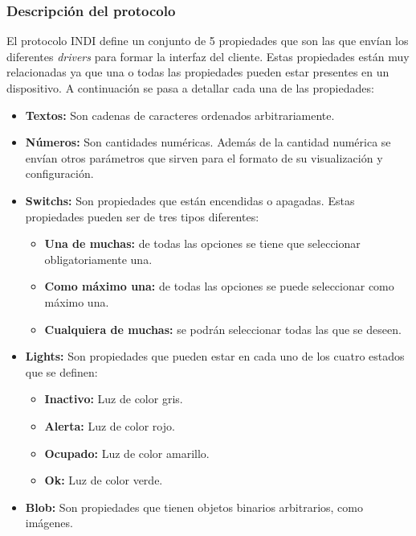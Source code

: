 \subsubsection{Descripción del protocolo}
El protocolo INDI define un conjunto de 5 propiedades que son las que envían los diferentes \textit{drivers} para formar la interfaz del cliente. Estas propiedades están muy relacionadas ya que una o todas las propiedades pueden estar presentes en un dispositivo. A continuación se pasa a detallar cada una de las propiedades:
\begin{itemize}
  \item \textbf{Textos:} Son cadenas de caracteres ordenados arbitrariamente.
  \item \textbf{Números:} Son cantidades numéricas. Además de la cantidad numérica se envían otros parámetros que sirven para el formato de su visualización y configuración.
  \item \textbf{Switchs:} Son propiedades que están encendidas o apagadas. Estas propiedades pueden ser de tres tipos diferentes:
    \begin{itemize}
      \item \textbf{Una de muchas:} de todas las opciones se tiene que seleccionar obligatoriamente una.
	    \item \textbf{Como máximo una:} de todas las opciones se puede seleccionar como máximo una.
	    \item \textbf{Cualquiera de muchas:} se podrán seleccionar todas las que se deseen.
    \end{itemize}
  \item \textbf{Lights:} Son propiedades que pueden estar en cada uno de los cuatro estados que se definen:
    \begin{itemize}
      \item \textbf{Inactivo:} Luz de color gris.
      \item \textbf{Alerta:} Luz de color rojo.
      \item\textbf{Ocupado:} Luz de color amarillo.
      \item \textbf{Ok:} Luz de color verde.
    \end{itemize}
  \item \textbf{Blob:} Son propiedades que tienen objetos binarios arbitrarios, como imágenes.
\end{itemize}

